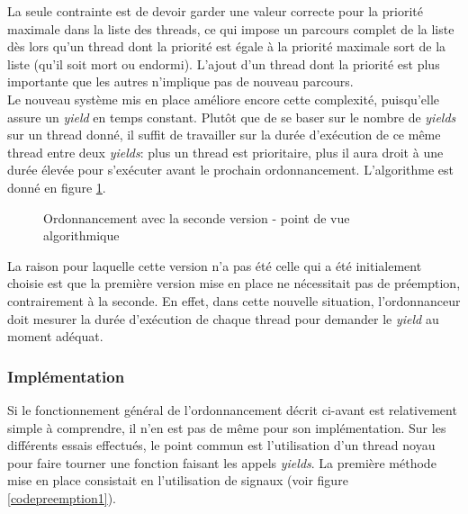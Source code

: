 \documentclass[a4paper,11pt]{article}
\begin{document}
La seule contrainte est de devoir garder une valeur correcte pour la priorité maximale dans la liste des threads, ce qui impose un parcours complet de la liste dès lors qu'un thread dont la priorité est égale à la priorité maximale sort de la liste (qu'il soit mort ou endormi). L'ajout d'un thread dont la priorité est plus importante que les autres n'implique pas de nouveau parcours.\\

Le nouveau système mis en place améliore encore cette complexité, puisqu'elle assure un \textit{yield} en temps constant. Plutôt que de se baser sur le nombre de \textit{yields} sur un thread donné, il suffit de travailler sur la durée d'exécution de ce même thread entre deux \textit{yields}: plus un thread est prioritaire, plus il aura droit à une durée élevée pour s'exécuter avant le prochain ordonnancement. L'algorithme est donné en figure \ref{priority2}.

\begin{figure}[H]
\begin{algorithm}[H]
\end{algorithm}
\caption{Ordonnancement avec la seconde version - point de vue algorithmique}
\label{priority2}
\end{figure}

La raison pour laquelle cette version n'a pas été celle qui a été initialement choisie est que la première version mise en place ne nécessitait pas de préemption, contrairement à la seconde. En effet, dans cette nouvelle situation, l'ordonnanceur doit mesurer la durée d'exécution de chaque thread pour demander le \textit{yield} au moment adéquat.

\subsubsection*{Implémentation}

Si le fonctionnement général de l'ordonnancement décrit ci-avant est relativement simple à comprendre, il n'en est pas de même pour son implémentation. Sur les différents essais effectués, le point commun est l'utilisation d'un thread noyau pour faire tourner une fonction faisant les appels \textit{yields}. La première méthode mise en place consistait en l'utilisation de signaux (voir figure \ref{codepreemption1}).
\end{document}
